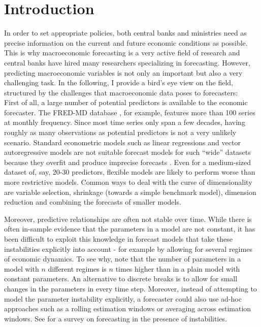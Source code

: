 \chapter{Introduction} %

In order to set appropriate policies, both central banks and ministries need as precise information on the current and future economic conditions as possible. This is why macroeconomic forecasting is a very active field of research and central banks have hired many researchers specializing in forecasting. %
However, predicting macroeconomic variables is not only an important but also a very challenging task. In the following, I provide a bird's eye view on the field, structured by the challenges that macroeconomic data poses to forecasters:\\


First of all, a large number of potential predictors is available to the economic forecaster. The FRED-MD database \citep{McCrackenNg2016}, for example, features more than 100 series at monthly frequency. Since most time series only span a few decades, having roughly as many observations as potential predictors is not a very unlikely scenario. Standard econometric models such as linear regressions and vector autoregressive models are not suitable forecast models for such ``wide'' datasets because they overfit and produce imprecise forecasts \citep{StockWatson2006}. Even for a medium-sized dataset of, say, 20-30 predictors, flexible models are likely to perform worse than more restrictive models. Common ways to deal with the curse of dimensionality are variable selection, shrinkage (towards a simple benchmark model), dimension reduction and combining the forecasts of smaller models.

Moreover, predictive relationships are often not stable over time. While there is often in-sample evidence that the parameters in a model are not constant, it has been difficult to exploit this knowledge in forecast models that take these instabilities explicitly into account - for example by allowing for several regimes of economic dynamics. To see why, note that the number of parameters in a model with $n$ different regimes is $n$ times higher than in a plain model with constant parameters. An alternative to discrete breaks is to allow for small changes in the parameters in every time step. Moreover, instead of attempting to model the parameter instability explicitly, a forecaster could also use ad-hoc approaches such as a rolling estimation windows or averaging across estimation windows.  See \citet{Rossi2013} for a survey on forecasting in the presence of instabilities.

